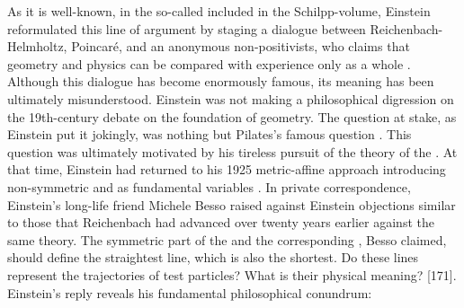 \documentclass[draft]{article}
\begin{document}
As it is well-known, in the so-called  \citep{Einstein1949a} included in the Schilpp-volume, Einstein reformulated this line of argument by staging a dialogue between Reichenbach-Helmholtz, Poincaré, and an anonymous non-positivists, who claims that geometry and physics can be compared with experience only as a whole \citep[676f.]{Einstein1949a}. Although this dialogue has become enormously famous, its meaning has been ultimately misunderstood. Einstein was not making a philosophical digression on the 19th-century debate on the foundation of geometry. The question at stake, as Einstein put it jokingly, was nothing but Pilates's famous question  \citep[676]{Einstein1949a}. This question was ultimately motivated by his tireless pursuit of the theory of the . At that time, Einstein had returned to his 1925 metric-affine approach introducing non-symmetric \gmn and \Gtmn as fundamental variables \citep{Einstein1945,Einstein1945-04}. In private correspondence, Einstein's long-life friend Michele Besso raised against Einstein objections similar to those that Reichenbach had advanced over twenty years earlier against the same theory. The symmetric part of the \gmn and the corresponding \Gtmn, Besso claimed, should define the straightest line, which is also the shortest. Do these lines represent the trajectories of test particles? What is their physical meaning? [171]. Einstein's reply reveals his fundamental philosophical conundrum:
\end{document}
